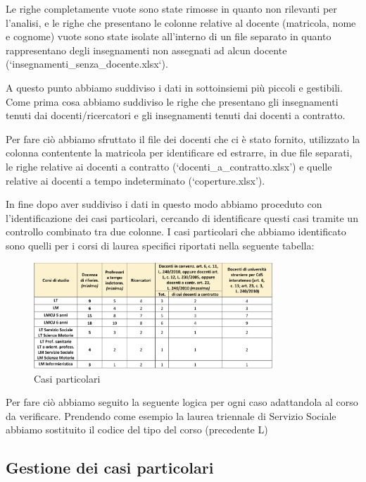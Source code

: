 Le righe completamente vuote sono state rimosse in quanto non rilevanti per l'analisi, e le righe che presentano le colonne relative al docente (matricola, nome e cognome) vuote sono state
isolate all'interno di un file separato in quanto rappresentano degli insegnamenti non assegnati ad alcun docente (`insegnamenti_senza_docente.xlsx`).

A questo punto abbiamo suddiviso i dati in sottoinsiemi più piccoli e gestibili.
Come prima cosa abbiamo suddiviso le righe che presentano gli insegnamenti tenuti dai docenti/ricercatori e gli insegnamenti tenuti dai docenti a contratto.

Per fare ciò abbiamo sfruttato il file dei docenti che ci è stato fornito, utilizzato la colonna contentente la matricola per identificare ed estrarre, in due file separati,
le righe relative ai docenti a contratto (`docenti_a_contratto.xlsx') e quelle relative ai docenti a tempo indeterminato (`coperture.xlsx').

In fine dopo aver suddiviso i dati in questo modo abbiamo proceduto con l'identificazione dei casi particolari,
cercando di identificare questi casi tramite un controllo combinato tra due colonne.
I casi particolari che abbiamo identificato sono quelli per i corsi di laurea specifici riportati nella seguente tabella:
\begin{figure}[h]
    \centering
    \includegraphics[width=0.8\textwidth]{images/tabella_ministeriale.png}
    \caption{Casi particolari}
    \label{fig:casi_particolari}
\end{figure}
Per fare ciò abbiamo seguito la seguente logica per ogni caso adattandola al corso da verificare.
Prendendo come esempio la laurea triennale di Servizio Sociale abbiamo sostituito il codice del tipo del corso (precedente L)



\subsection{Gestione dei casi particolari}

